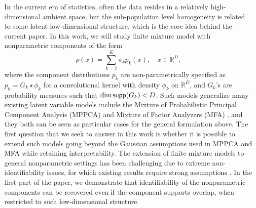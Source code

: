 \documentclass[bj,authoryear]{imsart}
\theoremstyle{plain}
\theoremstyle{remark}
\def\bbR{\mathbb{R}}
\def\supp{{\sf supp}}
\begin{document}
In the current era of statistics, often the data resides in a relatively high-dimensional ambient space, but the sub-population level homogeneity is related to some latent low-dimensional structure, which is the core idea behind the current paper. In this work, we will study finite mixture model with nonparametric components of the form
\begin{equation}
    p(x) = \sum_{k=1}^K \pi_k p_k(x), \quad x\in \bbR^D,
\end{equation}
where the component distributions $p_k$ are non-parametrically specified as $p_k = G_k \star \phi_k$ for a convolutional kernel with density $\phi_k$ on $\bbR^D$, and $G_k$'s are probability measures such that $\dim \supp (G_k) < D$. Such models generalize many existing latent variable models include the Mixture of Probabilistic Principal Component Analysis (MPPCA) \cite{tipping1999mixtures} and Mixture of Factor Analyzers (MFA) \cite{mclachlan2003modelling}, and they both can be seen as particular cases for the general formulation above. 
The first question that we seek to answer in this work is whether it is possible to extend such models going beyond the Gaussian assumptions used in MPPCA and MFA while retaining interpretability. 
The extension of finite mixture models to general nonparametric settings has been challenging due to extreme non-identifiability issues, for which existing results require strong assumptions \cite{bordes2006semiparametric, hunter2007inference, jochmans2017inference,aragam2020identifiability}. In the first part of the paper, we demonstrate that identifiability of the nonparametric components can be recovered even if the component supports overlap, when restricted to such low-dimensional structure. 
\end{document}
